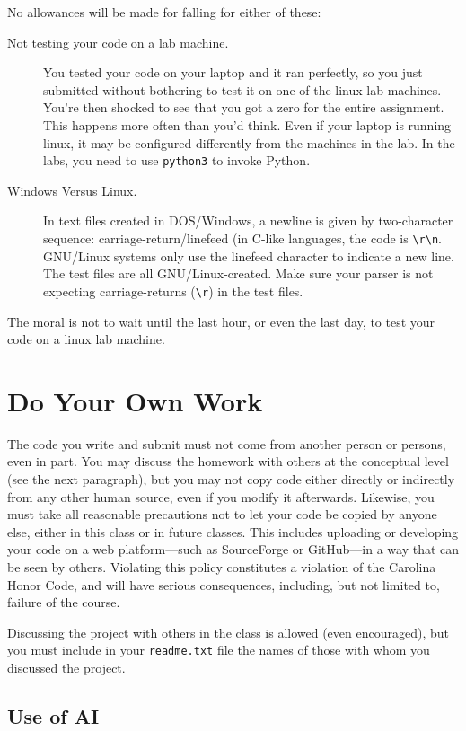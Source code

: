 \documentclass[11pt]{article}
\renewcommand{\t}[1]{\texttt{#1}}
\theoremstyle{definition}
\begin{document}
No allowances will be made for falling for either of these:

\begin{description}
\item[Not testing your code on a lab machine.]
You tested your code on your laptop and it ran perfectly, so you just submitted without bothering to test it on one of the linux lab machines.  You're then shocked to see that you got a zero for the entire assignment.  This happens more often than you'd think.  Even if your laptop is running linux, it may be configured differently from the machines in the lab.  In the labs, you need to use \t{python3} to invoke Python.
\item[Windows Versus Linux.]  In text files created in DOS/Windows, a newline is given by two-character sequence: carriage-return/linefeed (in C-like languages, the code is \verb+\r\n+.  GNU/Linux systems only use the linefeed character to indicate a new line.  The test files are all GNU/Linux-created.  Make sure your parser is not expecting carriage-returns (\verb+\r+) in the test files.
\end{description}

The moral is not to wait until the last hour, or even the last day, to test your code on a linux lab machine.

\section{Do Your Own Work}

The code you write and submit must not come from another person or persons, even in part.  You may discuss the homework with others at the conceptual level (see the next paragraph), but you may not copy code either directly or indirectly from any other human source, even if you modify it afterwards.  Likewise, you must take all reasonable precautions not to let your code be copied by anyone else, either in this class or in future classes.  This includes uploading or developing your code on a web platform---such as SourceForge or GitHub---in a way that can be seen by others.  Violating this policy constitutes a violation of the Carolina Honor Code, and will have serious consequences, including, but not limited to, failure of the course.

Discussing the project with others in the class is allowed (even encouraged), but you must include in your \t{readme.txt} file the names of those with whom you discussed the project.

\subsection{Use of AI}
\end{document}
